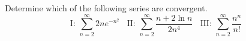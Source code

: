 \documentclass{ximera}
\begin{document}
\begin{question}%

Determine which of the following series are convergent. 
\[ \text{I: } \sum_{n=2}^\infty 2ne^{-n^2} \ \ \ \ \text{II: } \sum_{n=2}^\infty \frac{n + 2 \ln n}{2 n^4} \ \ \ \ \text{III: } \sum_{n=2}^\infty \frac{n^n}{n!} \]
\begin{multiplechoice}
\end{multiplechoice}

\end{question}
\end{document}
